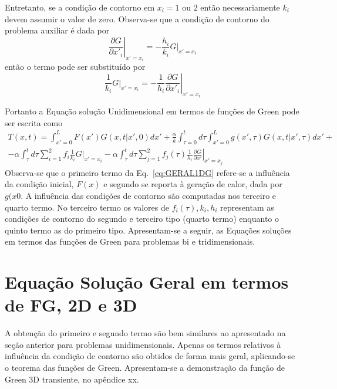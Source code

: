 Entretanto, se a condição de contorno em $x_i=1$ ou $2$ então necessariamente $k_i$ devem assumir o valor de zero. Observa-se que a condição de contorno do problema auxiliar é dada por
\begin{equation}\label{eq:ccG2}
    \left.{\frac{\partial{G}}{\partial{x'_i}}}\right|_{x'=x_i} = 
    -\frac{h_i}{k_i} \left.{G}\right|_{x'=x_i}
\end{equation}
então o termo  pode ser substituído por
\begin{equation}\label{eq:ccG3}
    \frac{1}{k_i} \left.{G}\right|_{x'=x_i} = 
    -\frac{1}{h_i} \left.{\frac{\partial{G}}{\partial{x'_i}}}\right|_{x'=x_i}
\end{equation}

Portanto a Equação solução Unidimensional em termos de funções de Green pode ser escrita como
\begin{equation}\label{eq:GERAL1DG}
  \begin{split}
   T(x,t) = \int_{x'=0}^{L} F(x')G(x,t|x',0) dx' +
    \frac{\alpha}{k}
    \int_{\tau=0}^{t} d\tau\int_{x'=0}^{L}g(x',\tau)G(x,t|x',\tau) dx' + \\
    -\alpha\int_{\tau}^{t} d\tau\sum_{i=1}^{2} f_i\frac{1}{k_i} 
    \left. G \right|_{x'=x_i} - 
    \alpha \int_{\tau}^{t} d\tau\sum_{j=1}^{2} f_j(\tau)
    \frac{1}{h_i}
    \left. \frac{\partial{G}}{\partial{x'}} \right|_{x'=x_j}     
  \end{split}
\end{equation}  
	Observa-se que o primeiro termo da Eq.~\ref{eq:GERAL1DG} refere-se a influência da condição inicial, $F(x)$ e  segundo  se reporta à geração de calor, dada por $g(x0$. A influência das condições de contorno são computadas nos terceiro e quarto termo. No terceiro termo os valores de  $f_i(\tau), k_i, h_i$ representam as condições de contorno do segundo e terceiro tipo (quarto termo) enquanto o quinto termo as do primeiro tipo.
Apresentam-se a seguir, as Equações soluções em termos das funções de Green para problemas bi e tridimensionais.
\section{Equação Solução Geral em termos de FG, 2D e 3D}
A obtenção do primeiro e segundo termo são bem similares ao apresentado na seção anterior para problemas unidimensionais. Apenas os termos relativos à influência da condição de contorno são obtidos de forma mais geral, aplicando-se o teorema das funções de Green. Apresentam-se  a demonstração da função de Green 3D transiente, no apêndice xx.
	
